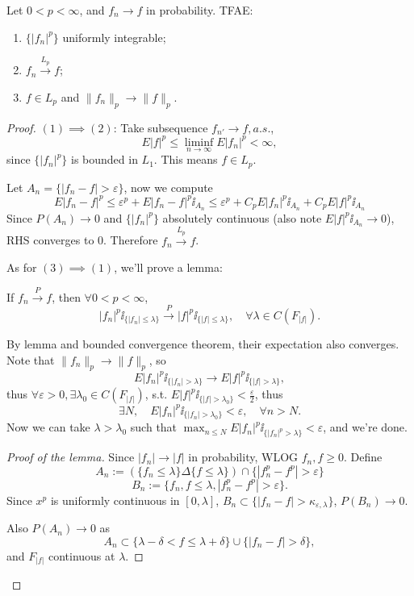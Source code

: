 \begin{theorem}
    Let $0<p<\infty$, and $f_n\to f$ in probability. TFAE:
	\begin{enumerate}[\indent (1)]
		\item $\{|f_n|^p\}$ uniformly integrable;
		\item $f_n \xrightarrow{L_p} f$;
		\item $f\in L_p$ and $ \lVert f_n \rVert _p \to \lVert f \rVert _p$.
	\end{enumerate}
\end{theorem}
\begin{proof}[Proof]
    $(1)\implies (2)$: Take subsequence $f_{n'} \to f, a.s.$,
	\[
	E|f|^p \le \liminf_{n\to \infty} E|f_n|^p < \infty,
	\]
	since $\{|f_n|^p\}$ is bounded in $L_1$. This means $f\in L_p$.

	Let $A_n = \{|f_n - f|> \varepsilon\}$, now we compute
	\[
	E|f_n - f|^p \le \varepsilon^p + E|f_n - f|^p \ii_{A_n}
	\le \varepsilon^p + C_p E|f_n|^p \ii_{A_n} + C_p E|f|^p\ii_{A_n}
	\]
	Since $P(A_n) \to 0$ and $\{|f_n|^p\}$ absolutely continuous
	(also note $E|f|^p \ii_{A_n} \to 0$), RHS converges to 0.
	Therefore $f_n \xrightarrow{L_p} f$.

	As for $(3)\implies (1)$, we'll prove a lemma:
	\begin{lemma}
		If $f_n \xrightarrow{P} f$, then $\forall 0<p<\infty$,
		\[
		|f_n|^p \ii_{\{|f_n|\le \lambda\}} \xrightarrow{P}
		|f|^p \ii_{\{|f|\le \lambda\}}, \quad \forall \lambda \in C(F_{|f|}).
		\]
	\end{lemma}

	By lemma and bounded convergence theorem, their expectation also converges.
	Note that $ \lVert f_n \rVert _p \to \lVert f \rVert _p$, so
	\[
	E|f_n|^p\ii_{\{|f_n|>\lambda\}} \to E|f|^p\ii_{\{|f|>\lambda\}},
	\]
	thus $\forall \varepsilon>0, \exists \lambda_0\in C(F_{|f|})$, s.t.
	$E|f|^p\ii_{\{|f|>\lambda_0\}} < \frac{\varepsilon}{2}$, thus
	\[
	\exists N,\quad E|f_n|^p \ii_{\{|f_n|>\lambda_0\}} < \varepsilon, \quad
	\forall n>N.
	\]
	Now we can take $\lambda > \lambda_0$ such
	that $\max_{n\le N} E|f_n|^p\ii_{\{|f_n|^p > \lambda\}} < \varepsilon$,
	and we're done.

	\begin{proof}[Proof of the lemma]
	    Since $|f_n| \to |f|$ in probability, WLOG $f_n ,f \ge 0$.
		Define
		\[
		A_n := (\{f_n \le \lambda\}\Delta\{f\le \lambda\}) \cap
		\{|f_n^p-f^p|>\varepsilon\}
		\]
		\[
		B_n := \{f_n, f\le \lambda, |f_n^p - f^p| > \varepsilon\}.
		\]
		Since $x^p$ is uniformly continuous in $[0, \lambda]$,
		$B_n \subset \{|f_n - f| > \kappa_{\varepsilon, \lambda}\}$,
		$P(B_n) \to 0$.

		Also $P(A_n) \to 0$ as
		\[
		A_n \subset \{\lambda-\delta<f\le \lambda+\delta\}
		\cup \{|f_n - f|>\delta\},
		\]
		and $F_{|f|}$ continuous at $\lambda$.
	\end{proof}
\end{proof}

